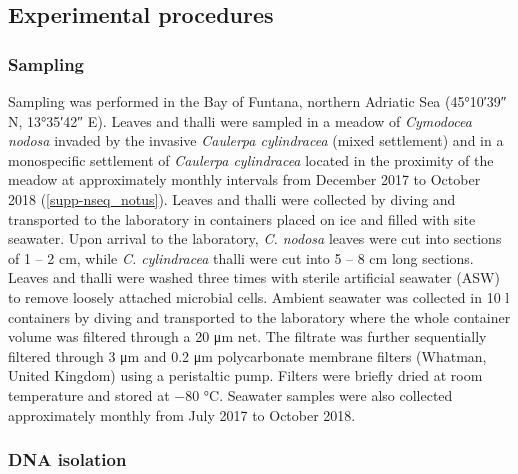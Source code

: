 \documentclass[12pt,]{article}
\begin{document}
\newpage

\hypertarget{experimental-procedures}{%
\subsection{Experimental procedures}\label{experimental-procedures}}

\hypertarget{sampling}{%
\subsubsection{Sampling}\label{sampling}}

Sampling was performed in the Bay of Funtana, northern Adriatic Sea
(\ang{45;10;39} N, \ang{13;35;42} E). Leaves and thalli were sampled in
a meadow of \emph{Cymodocea nodosa} invaded by the invasive
\emph{Caulerpa cylindracea} (mixed settlement) and in a monospecific
settlement of \emph{Caulerpa cylindracea} located in the proximity of
the meadow at approximately monthly intervals from December 2017 to
October 2018 (\autoref{supp-nseq_notus}). Leaves and thalli were
collected by diving and transported to the laboratory in containers
placed on ice and filled with site seawater. Upon arrival to the
laboratory, \emph{C. nodosa} leaves were cut into sections of 1 -- 2
\si{\cm}, while \emph{C. cylindracea} thalli were cut into 5 -- 8
\si{\cm} long sections. Leaves and thalli were washed three times with
sterile artificial seawater (ASW) to remove loosely attached microbial
cells. Ambient seawater was collected in 10 \si{\l} containers by diving
and transported to the laboratory where the whole container volume was
filtered through a 20 \si{\um} net. The filtrate was further
sequentially filtered through 3 \si{\um} and 0.2 \si{\um} polycarbonate
membrane filters (Whatman, United Kingdom) using a peristaltic pump.
Filters were briefly dried at room temperature and stored at \num{-80}
\si{\degreeCelsius}. Seawater samples were also collected approximately
monthly from July 2017 to October 2018.

\hypertarget{dna-isolation}{%
\subsubsection{DNA isolation}\label{dna-isolation}}
\end{document}
